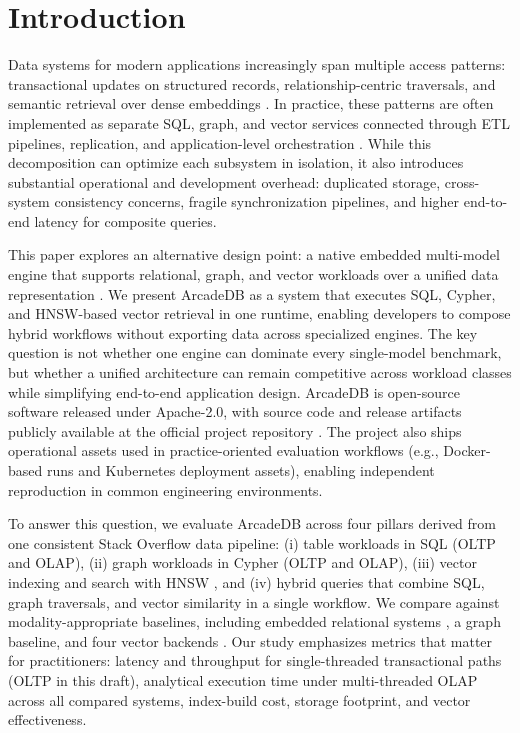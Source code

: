 \documentclass[sigconf, nonacm]{acmart}
\begin{document}
\section{Introduction}

Data systems for modern applications increasingly span multiple access patterns: transactional updates on structured records, relationship-centric traversals, and semantic retrieval over dense embeddings \cite{Lu_2019,Guo_2023,Pan_2024_vldbj}. In practice, these patterns are often implemented as separate SQL, graph, and vector services connected through ETL pipelines, replication, and application-level orchestration \cite{Ye_2023,Zhang_2019_Holistic}. While this decomposition can optimize each subsystem in isolation, it also introduces substantial operational and development overhead: duplicated storage, cross-system consistency concerns, fragile synchronization pipelines, and higher end-to-end latency for composite queries.

This paper explores an alternative design point: a native embedded multi-model engine that supports relational, graph, and vector workloads over a unified data representation \cite{Lu_2019,Kim_2022,Lei_2024}. We present ArcadeDB as a system that executes SQL, Cypher, and HNSW-based vector retrieval in one runtime, enabling developers to compose hybrid workflows without exporting data across specialized engines. The key question is not whether one engine can dominate every single-model benchmark, but whether a unified architecture can remain competitive across workload classes while simplifying end-to-end application design.
ArcadeDB is open-source software released under Apache-2.0, with source code and release artifacts publicly available at the official project repository \cite{arcadedb_repo}. The project also ships operational assets used in practice-oriented evaluation workflows (e.g., Docker-based runs and Kubernetes deployment assets), enabling independent reproduction in common engineering environments.

To answer this question, we evaluate ArcadeDB across four pillars derived from one consistent Stack Overflow data pipeline: (i) table workloads in SQL (OLTP and OLAP), (ii) graph workloads in Cypher (OLTP and OLAP), (iii) vector indexing and search with HNSW \cite{malkov2016efficient}, and (iv) hybrid queries that combine SQL, graph traversals, and vector similarity in a single workflow. We compare against modality-appropriate baselines, including embedded relational systems \cite{Gaffney_2022,Raasveldt_2019}, a graph baseline, and four vector backends \cite{Upreti_2025,Sun_2025,Hu_2025}. Our study emphasizes metrics that matter for practitioners: latency and throughput for single-threaded transactional paths (OLTP in this draft), analytical execution time under multi-threaded OLAP across all compared systems, index-build cost, storage footprint, and vector effectiveness.
\end{document}
